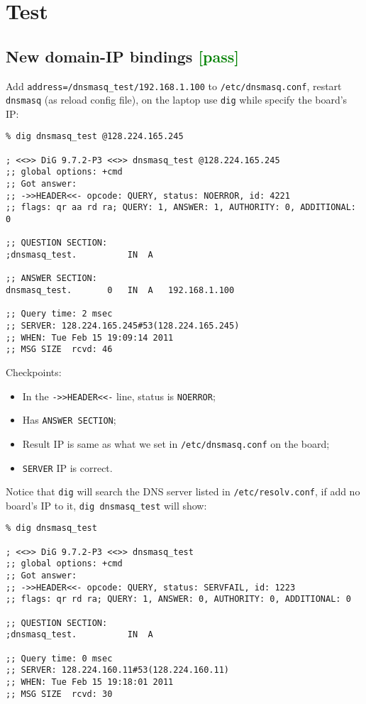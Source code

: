 \documentclass[a4paper]{report}
\begin{document}
\section{Test}
\subsection{New domain-IP bindings \textcolor{green}{[pass]}}
Add {\tt address=/dnsmasq\_test/192.168.1.100} to {\tt /etc/dnsmasq.conf}, restart
{\tt dnsmasq} (as reload config file), on the laptop use {\tt dig} while specify
the board's IP:
\begin{lstlisting}
% dig dnsmasq_test @128.224.165.245

; <<>> DiG 9.7.2-P3 <<>> dnsmasq_test @128.224.165.245
;; global options: +cmd
;; Got answer:
;; ->>HEADER<<- opcode: QUERY, status: NOERROR, id: 4221
;; flags: qr aa rd ra; QUERY: 1, ANSWER: 1, AUTHORITY: 0, ADDITIONAL: 0

;; QUESTION SECTION:
;dnsmasq_test.			IN	A

;; ANSWER SECTION:
dnsmasq_test.		0	IN	A	192.168.1.100

;; Query time: 2 msec
;; SERVER: 128.224.165.245#53(128.224.165.245)
;; WHEN: Tue Feb 15 19:09:14 2011
;; MSG SIZE  rcvd: 46
\end{lstlisting}
Checkpoints:
\begin{itemize}
    \item In the {\tt ->>HEADER<<-} line, status is {\tt NOERROR};
    \item Has {\tt ANSWER SECTION};
    \item Result IP is same as what we set in {\tt /etc/dnsmasq.conf} on the board;
    \item {\tt SERVER} IP is correct.
\end{itemize}
Notice that {\tt dig} will search the DNS server listed in {\tt /etc/resolv.conf},
if add no board's IP to it, {\tt dig dnsmasq\_test} will show:
\begin{lstlisting}
% dig dnsmasq_test                 

; <<>> DiG 9.7.2-P3 <<>> dnsmasq_test
;; global options: +cmd
;; Got answer:
;; ->>HEADER<<- opcode: QUERY, status: SERVFAIL, id: 1223
;; flags: qr rd ra; QUERY: 1, ANSWER: 0, AUTHORITY: 0, ADDITIONAL: 0

;; QUESTION SECTION:
;dnsmasq_test.			IN	A

;; Query time: 0 msec
;; SERVER: 128.224.160.11#53(128.224.160.11)
;; WHEN: Tue Feb 15 19:18:01 2011
;; MSG SIZE  rcvd: 30
\end{lstlisting}
\end{document}
